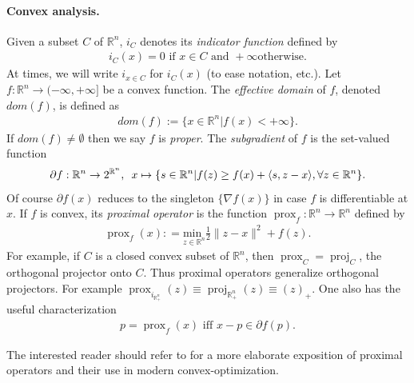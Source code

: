 \documentclass{article} %
\DeclareMathOperator{\proj}{proj}
\DeclareMathOperator{\prox}{prox}
\begin{document}
\paragraph{\textbf{Convex analysis.}}
Given a subset $C$ of $\mathbb{R}^n$,
$i_C$ denotes its \textit{indicator function} defined by
\begin{eqnarray}
  i_C(x) = 0 \text{ if } x \in C\text{ and }+\infty\text{
    otherwise.}
\end{eqnarray}
At times, we will write $i_{x \in C}$ for $i_C(x)$ (to ease notation,
etc.). Let $f : \mathbb{R}^n \rightarrow (-\infty, +\infty]$ be a
  convex function. The \textit{effective domain} of $f$, denoted
  $dom(f)$, is defined as
\begin{eqnarray}
  dom(f) := \{x \in \mathbb{R}^n | f(x) < +\infty\}.
\end{eqnarray}
 If $dom(f) \ne \emptyset$ then we say $f$ is \textit{proper}.
The \textit{subgradient} of $f$ is the set-valued function
\begin{eqnarray}
\partial f: \mathbb{R}^n \rightarrow 2^{\mathbb{R}^n}, \hspace{.5em} x \mapsto
\{s\in \mathbb{R}^n | f(z)  \ge f(x) + \langle s, z - x\rangle, \forall
z \in \mathbb{R}^n\}.
\end{eqnarray}
Of course $\partial f(x)$ reduces to the singleton $\{\nabla f(x)\}$
in case $f$ is differentiable at $x$. If $f$ is convex, its
\textit{proximal operator} is the function $\prox_f: \mathbb{R}^n
\rightarrow \mathbb{R}^n$ defined by
\begin{eqnarray}
  \prox_f(x): = \underset{z \in \mathbb{R}^n}{\text{min }}\frac{1}{2}\|z
  - x\|^2 + f(z).
\end{eqnarray}
For example, if $C$ is a closed convex subset of $\mathbb{R}^n$, then
$\prox_C = \proj_C$, the orthogonal projector onto $C$. Thus proximal
operators generalize orthogonal projectors. For example
$\prox_{i_{\mathbb{R}^n_+}}(z) \equiv \proj_{\mathbb{R}^n_+}(z) \equiv
(z)_+$. One also has the useful characterization
\begin{eqnarray}
  p = \prox_f(x)\text{ iff } x - p \in \partial f(p).
\end{eqnarray}

The interested reader should refer to \cite{combettes2011proximal} for
a more elaborate exposition of proximal operators and their
use in modern convex-optimization.
\end{document}
